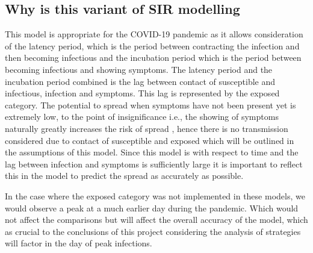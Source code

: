\documentclass[11pt]{article}
\begin{document}
\subsection{Why is this variant of SIR modelling}
This model is appropriate for the COVID-19 pandemic as it allows consideration of the latency period, which is the period between contracting the infection and then becoming infectious and the incubation period which is the period between becoming infectious and showing symptoms. The latency period and the incubation period combined is the lag between contact of susceptible and infectious, infection and symptoms. This lag is represented by the exposed category. The potential to spread when symptoms have not been present yet is extremely low, to the point of insignificance i.e., the showing of symptoms naturally greatly increases the risk of spread \citep{ spreadofCOVID-19}, hence there is no transmission considered due to contact of susceptible and exposed which will be outlined in the assumptions of this model. Since this model is with respect to time and the lag between infection and symptoms is sufficiently large\citep{10.1093/cid/ciab746} it is important to reflect this in the model to predict the spread as accurately as possible. \par
In the case where the exposed category was not implemented in these models, we would observe a peak at a much earlier day during the pandemic. Which would not affect the comparisons but will affect the overall accuracy of the model, which as crucial to the conclusions of this project considering the analysis of strategies will factor in the day of peak infections. 
\end{document}
